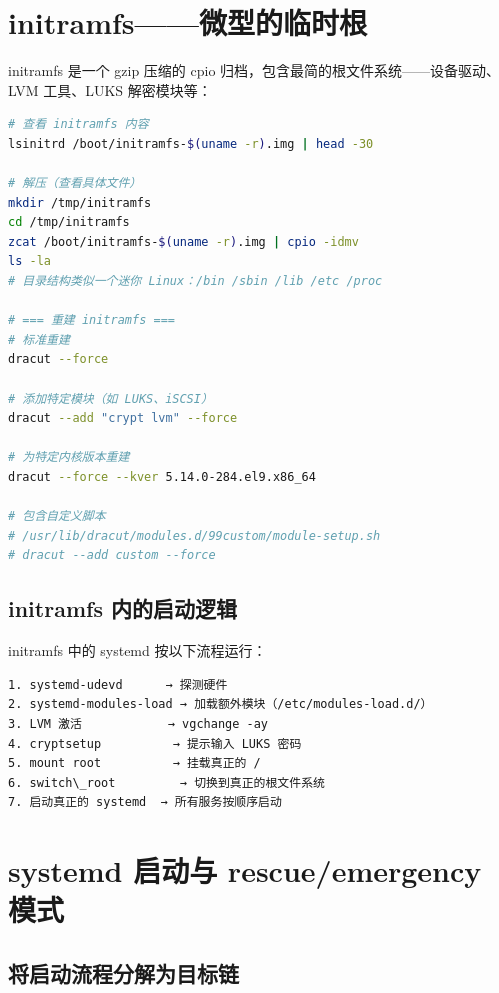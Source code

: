 \documentclass[12pt,UTF8]{ctexbook}
\begin{document}
\section{initramfs——微型的临时根}
\label{sec:initramfs}

initramfs 是一个 gzip 压缩的 cpio 归档，包含最简的根文件系统——设备驱动、LVM 工具、LUKS 解密模块等：

\begin{lstlisting}[language=bash]
# 查看 initramfs 内容
lsinitrd /boot/initramfs-$(uname -r).img | head -30

# 解压（查看具体文件）
mkdir /tmp/initramfs
cd /tmp/initramfs
zcat /boot/initramfs-$(uname -r).img | cpio -idmv
ls -la
# 目录结构类似一个迷你 Linux：/bin /sbin /lib /etc /proc

# === 重建 initramfs ===
# 标准重建
dracut --force

# 添加特定模块（如 LUKS、iSCSI）
dracut --add "crypt lvm" --force

# 为特定内核版本重建
dracut --force --kver 5.14.0-284.el9.x86_64

# 包含自定义脚本
# /usr/lib/dracut/modules.d/99custom/module-setup.sh
# dracut --add custom --force
\end{lstlisting}

\subsection{initramfs 内的启动逻辑}

initramfs 中的 systemd 按以下流程运行：

\begin{lstlisting}
1. systemd-udevd      → 探测硬件
2. systemd-modules-load → 加载额外模块（/etc/modules-load.d/）
3. LVM 激活            → vgchange -ay
4. cryptsetup          → 提示输入 LUKS 密码
5. mount root          → 挂载真正的 /
6. switch\_root         → 切换到真正的根文件系统
7. 启动真正的 systemd  → 所有服务按顺序启动
\end{lstlisting}

\section{systemd 启动与 rescue/emergency 模式}
\label{sec:systemd-boot}

\subsection{将启动流程分解为目标链}
\end{document}
